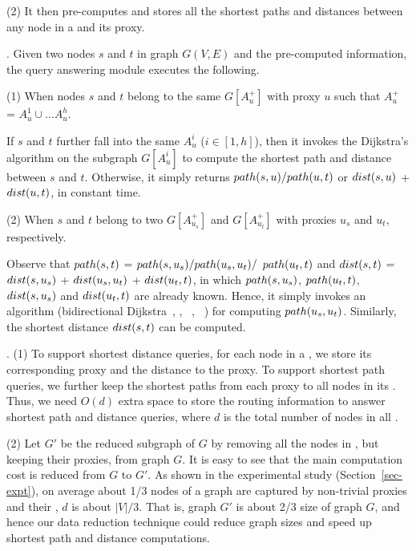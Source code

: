 \sstab (2) It then pre-computes and stores all the shortest paths and distances between any node in a \dra and its proxy.


. Given two nodes $s$ and $t$ in graph $G(V, E)$  and the pre-computed information, the query answering module executes the following.


\sstab (1) When nodes $s$ and $t$ belong to the same \dra $G[A^+_u]$ with proxy $u$ such that $A^+_u$ = $A^1_u\cup\ldots A^h_u$.

If $s$ and $t$ further fall into the same $A^i_u$ ($i\in[1,h]$), then it invokes the Dijkstra's algorithm on the subgraph $G[A^i_u]$ to compute the shortest path and distance between $s$ and $t$. Otherwise, it simply returns $\path(s, u)/\path(u, t)$ or $\dist(s, u)$ + $\dist(u, t)$, in constant time.

\sstab (2)  When $s$ and $t$ belong to two \dras $G[A^+_{u_s}]$ and $G[A^+_{u_t}]$ with proxies $u_s$ and $u_t$, respectively.

Observe that $\path(s, t)$ = $\path(s, u_s)/\path(u_s, u_t)/$ $\path(u_t, t)$ and $\dist(s, t)$ = $\dist(s, u_s)$ + $\dist(u_s, u_t)$ + $\dist(u_t, t)$, in which $\path(s, u_s)$, $\path(u_t, t)$, $\dist(s, u_s)$ and $\dist(u_t, t)$ are already known. Hence, it simply invokes an algorithm (\eg bidirectional Dijkstra~\cite{LubyR89}, \arcflag \cite{MohringSSWW05}, \ch~\cite{GeisbergerSSD08}, \tnr~\cite{bast2014route}) for computing $\path(u_s, u_t)$.
Similarly, the shortest distance $\dist(s, t)$ can be computed.

.
(1) To support shortest distance queries, for each node in a \dra, we store its corresponding proxy and the distance to the proxy. To support shortest path queries, we further keep the shortest paths from each proxy to all nodes in its \dra. Thus, we need $O(d)$ extra space to store the routing information to answer shortest path and distance queries, where $d$ is the total number of nodes in all \dras.

\sstab (2) Let $G'$ be the reduced subgraph of $G$ by removing all the nodes in \dras, but keeping their proxies, from graph $G$. It is easy to see that the main computation cost is reduced from $G$ to $G'$. As shown in the experimental study (Section~\ref{sec-expt}), on average about 1/3 nodes of a graph are captured by non-trivial proxies and their \dras, \ie $d$ is about $|V|/3$. That is, graph $G'$ is about 2/3 size of graph $G$, and hence our data reduction technique could reduce graph sizes and speed up shortest path and distance computations.
